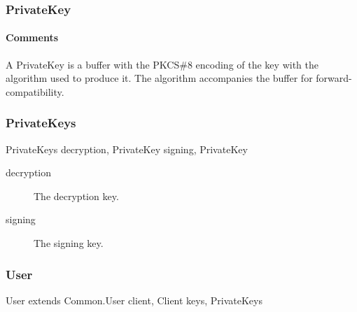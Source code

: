 \documentclass[a4paper,10pt]{article}
\begin{document}
\subsubsection{PrivateKey}

\begin{center}
\theverbbox
\end{center}

\begin{inparaitem}[ ]
 \item \infrastructure
\end{inparaitem}

\paragraph*{Comments}
A PrivateKey is a buffer with the PKCS\#8 encoding of the key with the algorithm used to produce it. The algorithm accompanies the buffer for forward-compatibility.

\subsubsection{PrivateKeys}
\label{sec:structure:client:private_keys}

\begin{verbbox}
PrivateKeys
{
  decryption, PrivateKey
  signing, PrivateKey
}
\end{verbbox}
\begin{center}
\theverbbox
\end{center}

\begin{inparaitem}[ ]
 \item \infrastructure
\end{inparaitem}

\SpecialItem
\begin{description}
 \item[decryption] The decryption key.
 \item[signing] The signing key.
\end{description}

\subsubsection{User}

\begin{verbbox}
User extends Common.User
{
  client, Client
  keys, PrivateKeys
}
\end{verbbox}
\begin{center}
\theverbbox
\end{center}
\end{document}
